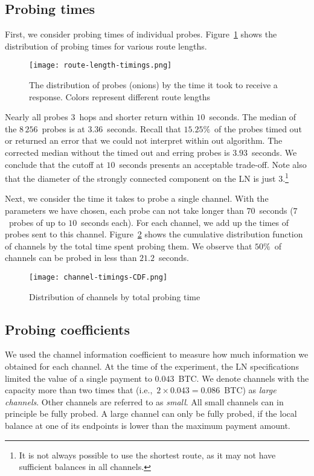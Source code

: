 \subsection{Probing times}

First, we consider probing times of individual probes.
Figure~\ref{fig:route-length-timings} shows the distribution of probing times for various route lengths.

\begin{figure}[ht]
	\centering
	\texttt{[image: route-length-timings.png]}
	\caption{The distribution of probes (onions) by the time it took to receive a response. Colors represent different route lengths}
	\label{fig:route-length-timings}
\end{figure}

Nearly all probes $3$~hops and shorter return within $10$~seconds.
The median of the $8\,256$~probes is at $3.36$~seconds.
Recall that $15.25\%$~of the probes timed out or returned an error that we could not interpret within out algorithm.
The corrected median without the timed out and erring probes is $3.93$~seconds. 
We conclude that the cutoff at $10$~seconds presents an acceptable trade-off.
Note also that the diameter of the strongly connected component on the LN is just $3$.\footnote{It is not always possible to use the shortest route, as it may not have sufficient balances in all channels.}

Next, we consider the time it takes to probe a single channel.
With the parameters we have chosen, each probe can not take longer than $70$~seconds ($7$~probes of up to $10$~seconds each).
For each channel, we add up the times of probes sent to this channel.
Figure~\ref{fig:channel-timings-CDF} shows the cumulative distribution function of channels by the total time spent probing them.
We observe that $50\%$~of channels can be probed in less than $21.2$~seconds.

\begin{figure}[ht]
	\centering
	\texttt{[image: channel-timings-CDF.png]}
	\caption{Distribution of channels by total probing time}
	\label{fig:channel-timings-CDF}
\end{figure}


\subsection{Probing coefficients}

We used the channel information coefficient to measure how much information we obtained for each channel.
At the time of the experiment, the LN specifications limited the value of a single payment to $0.043$~BTC\@.
We denote channels with the capacity more than two times that (i.e.,~$2 \times 0.043 = 0.086$~BTC) as \textit{large channels}.
Other channels are referred to as \textit{small}.
All small channels can in principle be fully probed.
A large channel can only be fully probed, if the local balance at one of its endpoints is lower than the maximum payment amount.

